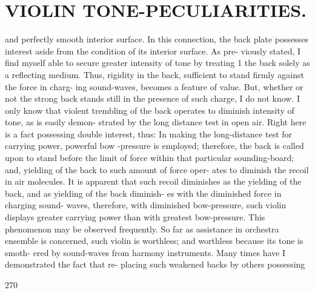 \documentclass{article}
\begin{document}
\section*{VIOLIN TONE-PECULIARITIES.}
and perfectly smooth interior surface. In this connection, the back plate possesses interest aside from the condition of its interior surface. As pre- viously stated, I find myself able to secure greater intensity of tone by treating 1 the back solely as a reflecting medium. Thus, rigidity in the back, sufficient to stand firmly against the force in charg- ing sound-waves, becomes a feature of value. But, whether or not the strong back stands still in the presence of such charge, I do not know. I only know that violent trembling of the back operates to diminish intensity of tone, as is easily demon- strated by the long distance test in open air. Right here is a fact possessing double interest, thus: In making the long-distance test for carrying power, powerful bow -pressure is employed; therefore, the back is called upon to stand before the limit of force within that particular sounding-board; and, yielding of the back to such amount of force oper- ates to diminish the recoil in air molecules. It is apparent that such recoil diminishes as the yielding of the back, and as yielding of the back diminish- es with the diminished force in charging sound- waves, therefore, with diminished bow-pressure, such violin displays greater carrying power than with greatest bow-pressure. This phenomenon may be observed frequently. So far as assistance in orchestra ensemble is concerned, such violin is worthless; and worthless because its tone is smoth- ered by sound-waves from harmony instruments. Many times have I demonstrated the fact that re- placing such weakened backs by others possessing

270
\end{document}
